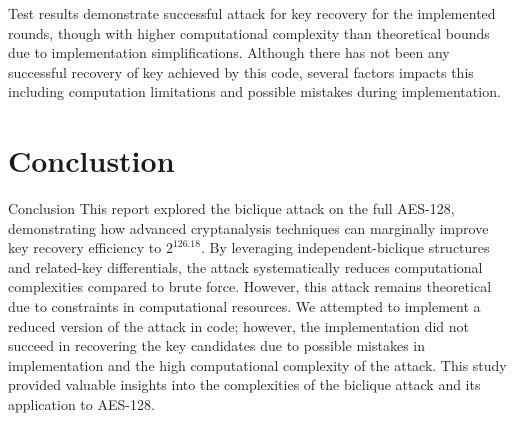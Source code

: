 \documentclass{report}
\begin{document}
Test results demonstrate successful attack for key recovery for the implemented rounds, though with higher computational complexity than theoretical bounds due to implementation simplifications. Although there has not been any successful recovery of key achieved by this code, several factors impacts this including computation limitations and possible mistakes during implementation.

\section{Conclustion}
Conclusion
This report explored the biclique attack on the full AES-128, demonstrating how advanced cryptanalysis techniques can marginally improve key recovery efficiency to 
$2^126.18$. By leveraging independent-biclique structures and related-key differentials, the attack systematically reduces computational complexities compared to brute force. However, this attack remains theoretical due to constraints in computational resources. We attempted to implement a reduced version of the attack in code; however, the implementation did not succeed in recovering the key candidates due to possible mistakes in implementation and the high computational complexity of the attack. This study provided valuable insights into the complexities of the biclique attack and its application to AES-128.


\end{document}
